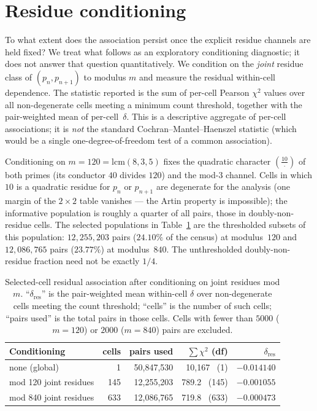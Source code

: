 \documentclass[11pt,reqno]{amsart}
\theoremstyle{plain}
\theoremstyle{definition}
\newcommand{\Lsym}[2]{\left(\tfrac{#1}{#2}\right)}
\begin{document}
\section{Residue conditioning}
\label{sec:decomposition}

To what extent does the association persist once the explicit residue channels
are held fixed? We treat what follows as an exploratory conditioning
diagnostic; it does not answer that question quantitatively. We condition on
the \emph{joint} residue class of
$(p_n, p_{n+1})$ to modulus $m$ and measure the residual within-cell
dependence. The statistic reported is the sum of per-cell Pearson $\chi^2$
values over all non-degenerate cells meeting a minimum count threshold,
together with the pair-weighted mean of per-cell~$\delta$. This is a
descriptive aggregate of per-cell associations; it is \emph{not} the standard
Cochran--Mantel--Haenszel statistic (which would be a single one-degree-of-freedom
test of a common association).

Conditioning on $m = 120 = \mathrm{lcm}(8,3,5)$ fixes the quadratic character
$\Lsym{10}{\cdot}$ of both primes (its conductor $40$ divides $120$) and the
mod-$3$ channel. Cells in which $10$ is a quadratic residue for $p_n$ or
$p_{n+1}$ are degenerate for the analysis (one margin of the $2\times2$ table
vanishes --- the Artin property is impossible); the informative population is
roughly a quarter of all pairs, those in doubly-non-residue cells. The
selected populations in Table~\ref{tab:decomp} are the thresholded subsets of
this population: $12{,}255{,}203$ pairs ($24.10\%$ of the census) at
modulus~$120$ and $12{,}086{,}765$ pairs ($23.77\%$) at modulus~$840$. The
unthresholded doubly-non-residue fraction need not be exactly $1/4$.

\begin{table}[ht]
	\centering
	\caption{Selected-cell residual association after conditioning on joint residues
		mod $m$.
		``$\delta_{\mathrm{res}}$'' is the pair-weighted mean within-cell $\delta$
		over non-degenerate cells meeting the count threshold;
		``cells'' is the number of such cells; ``pairs used'' is the total pairs
		in those cells. Cells with fewer than $5000$ ($m = 120$) or $2000$ ($m = 840$)
		pairs are excluded.}
	\label{tab:decomp}
	\begin{tabular}{lrrrr}
		\toprule
		Conditioning           & cells & pairs used     & $\sum \chi^2$ (df) & $\delta_{\mathrm{res}}$ \\
		\midrule
		none (global)          & 1     & 50{,}847{,}530 & 10{,}167 \ (1)     & $-0.014140$             \\
		mod 120 joint residues & 145   & 12{,}255{,}203 & 789.2 \ (145)      & $-0.001055$             \\
		mod 840 joint residues & 633   & 12{,}086{,}765 & 719.8 \ (633)      & $-0.000473$             \\
		\bottomrule
	\end{tabular}
\end{table}
\end{document}
